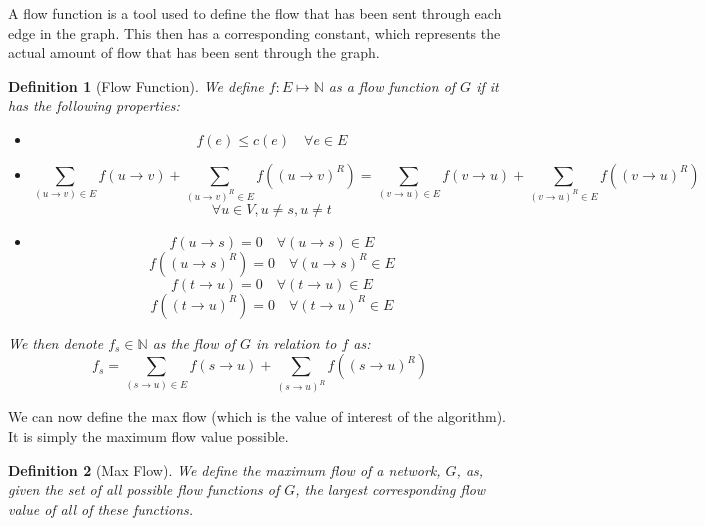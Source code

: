 \documentclass{report}
\newtheorem{definition}{Definition}[section]
\begin{document}
A flow function is a tool used to define the flow that has been sent through each edge in the graph. This then has a corresponding constant, which represents the actual amount of flow that has been sent through the graph.
\begin{definition}[Flow Function]
    We define $f : E \mapsto \mathbb{N}$ as a flow function of $G$ if it has the following properties:
    \begin{itemize}
        \item
            $$f(e) \le c(e) \quad \forall e \in E$$
        \item
            $$\sum_{(u \rightarrow v) \in E}f(u \rightarrow v) + \sum_{(u \rightarrow v)^R \in E}f((u \rightarrow v)^R) = \sum_{(v \rightarrow u) \in E}f(v \rightarrow u) + \sum_{(v \rightarrow u)^R \in E}f((v \rightarrow u)^R)$$
            $$\forall u \in V, u \ne s, u \ne t$$
        \item
            $$f(u \rightarrow s) = 0 \quad \forall (u \rightarrow s) \in E$$
            $$f((u \rightarrow s)^R) = 0 \quad \forall (u \rightarrow s)^R \in E$$
            $$f(t \rightarrow u) = 0 \quad \forall (t \rightarrow u) \in E$$
            $$f((t \rightarrow u)^R) = 0 \quad \forall (t \rightarrow u)^R \in E$$
    \end{itemize}
    We then denote $f_s \in \mathbb{N}$ as the flow of $G$ in relation to $f$ as:
    $$f_s = \sum_{(s \rightarrow u) \in E}f(s \rightarrow u) + \sum_{(s \rightarrow u)^R}f((s \rightarrow u)^R)$$
\end{definition}

We can now define the max flow (which is the value of interest of the algorithm). It is simply the maximum flow value possible.
\begin{definition}[Max Flow]
    We define the maximum flow of a network, $G$, as, given the set of all possible flow functions of $G$, the largest corresponding flow value of all of these functions.
\end{definition}
\end{document}
